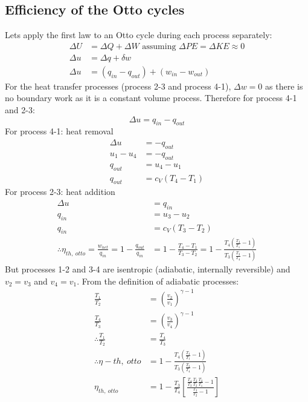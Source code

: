 \documentclass[class=report, crop=false, 12pt,a4paper]{standalone}
\begin{document}
\subsection{Efficiency of the Otto cycles}
Lets apply the first law to an Otto cycle during each process separately:
\begin{align}
  \Delta U &= \Delta Q + \Delta W \textrm{ assuming } \Delta PE = \Delta KE \approx 0\\
  \Delta u &= \Delta q + \delta w\\
  \Delta u &= (q_{in} - q_{out}) + (w_{in} - w_{out})
\end{align}
For the heat transfer processes (process 2-3 and process 4-1), $\Delta w = 0$ as there is no boundary work as it is a constant volume process. Therefore for process 4-1 and 2-3:
\begin{equation}
  \Delta u = q_{in} - q_{out}
\end{equation}
For process 4-1: heat removal
\begin{align}
  \Delta u &= -q_{out}\\
  u_1 - u_4 &= - q_{out}\\
  q_{out} &= u_4 - u_1\\
  q_{out} &= c_V(T_4 - T_1)
\end{align}
For process 2-3: heat addition
\begin{align}
  \Delta u &= q_{in}\\
  q_{in} &= u_3 - u_2\\
  q_{in} &= c_V(T_3 - T_2)\\
  \therefore \eta_{th , \ otto} = \frac{w_{net}}{q_{in}} = 1 - \frac{q_{out}}{q_{in}} &= 1 - \frac{T_4 - T_1}{T_3 - T_2} = 1 - \frac{T_4 \left( \frac{T_4}{T_1} -1 \right)}{T_3 \left( \frac{T_3}{T_4} - 1 \right)}
\end{align}
But processes 1-2 and 3-4 are isentropic (adiabatic, internally reversible) and $v_2 = v_3$ and $v_4 = v_1$. From the definition of adiabatic processes:
\begin{align}
  \frac{T_1}{T_2} &= \left( \frac{v_2}{v_1} \right)^{\gamma -1}\\
  \frac{T_4}{T_3} &= \left( \frac{v_3}{v_4} \right)^{\gamma -1}\\
  \therefore \frac{T_1}{T_2} &= \frac{T_4}{T_3}\\
  \therefore \eta-{th, \ otto} &= 1 - \frac{T_4 \left( \frac{T_4}{T_1} -1 \right)}{T_3 \left( \frac{T_3}{T_4} - 1 \right)}\\
  \eta_{th, \ otto} &= 1 - \frac{T_3}{T_4}\left[ \frac{\frac{T_4}{T_3} \frac{T_3}{T_2} \frac{T_2}{T_1} - 1}{\frac{T_3}{T_2} -1} \right]
\end{align}
\end{document}
